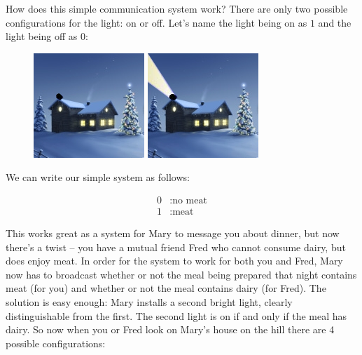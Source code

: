 \documentclass[UTF8]{book}
\begin{document}
\begin{CJK}{UTF8}{gbsn}
How does this simple communication system work? There are only two possible configurations for the light: on or off. Let's name the light being on as $1$ and the light being off as $0$:


\begin{figure}[H]
\centering
\begin{minipage}{.5\textwidth}
  \centering
  \includegraphics[width=.5\linewidth]{house_on_hill_0}
\end{minipage}%
\begin{minipage}{.5\textwidth}
  \centering
  \includegraphics[width=.5\linewidth]{house_on_hill_1}
\end{minipage}
\end{figure}

We can write our simple system as follows:

\begin{align*}
	0&: \text{no meat} \\
	1&: \text{meat}
\end{align*}

This works great as a system for Mary to message you about dinner, but now there's a twist -- you have a mutual friend Fred who cannot consume dairy, but does enjoy meat. In order for the system to work for both you and Fred, Mary now has to broadcast whether or not the meal being prepared that night contains meat (for you) and whether or not the meal contains dairy (for Fred). The solution is easy enough: Mary installs a second bright light, clearly distinguishable from the first. The second light is on if and only if the meal has dairy. So now when you or Fred look on Mary's house on the hill there are 4 possible configurations:


\end{CJK}
\end{document}
